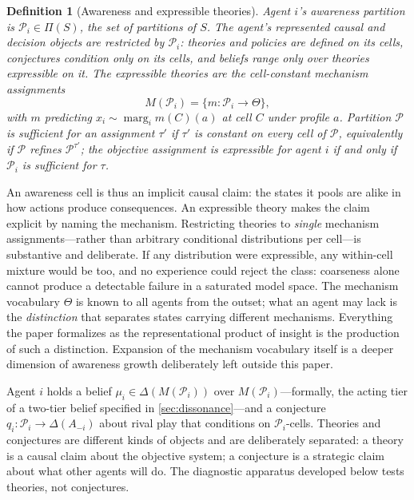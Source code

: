 \documentclass[11pt]{article}
\newtheorem{definition}[assumption]{Definition}
\theoremstyle{definition}
\newcommand{\marg}[1]{\operatorname{marg}_{#1}}
\begin{document}
\begin{definition}[Awareness and expressible theories]
\label{def:awareness}
Agent $i$'s awareness partition is $\mathcal P_i\in\Pi(S)$, the set of partitions of $S$.
The agent's represented causal and decision objects are restricted by \(\mathcal P_i\): theories and policies are defined on its cells, conjectures condition only on its cells, and beliefs range only over theories expressible on it.
The \emph{expressible theories} are the cell-constant mechanism assignments
\begin{equation}
M(\mathcal P_i)=\{m:\mathcal P_i\to\Theta\},
\label{eq:expressible}
\end{equation}
with $m$ predicting $x_i\sim\marg{i}m(C)(a)$ at cell $C$ under profile $a$.
Partition $\mathcal P$ is \emph{sufficient} for an assignment $\tau'$ if $\tau'$ is constant on every cell of $\mathcal P$, equivalently if $\mathcal P$ refines $\mathcal P^{\tau'}$; the objective assignment is expressible for agent $i$ if and only if $\mathcal P_i$ is sufficient for $\tau$.
\end{definition}

An awareness cell is thus an implicit causal claim: the states it pools are alike in how actions produce consequences.
An expressible theory makes the claim explicit by naming the mechanism.
Restricting theories to \emph{single} mechanism assignments---rather than arbitrary conditional distributions per cell---is substantive and deliberate.
If any distribution were expressible, any within-cell mixture would be too, and no experience could reject the class: coarseness alone cannot produce a detectable failure in a saturated model space.
The mechanism vocabulary $\Theta$ is known to all agents from the outset; what an agent may lack is the \emph{distinction} that separates states carrying different mechanisms.
Everything the paper formalizes as the representational product of insight is the production of such a distinction.
Expansion of the mechanism vocabulary itself is a deeper dimension of awareness growth deliberately left outside this paper.

Agent $i$ holds a belief $\mu_i\in\Delta(M(\mathcal P_i))$ over $M(\mathcal P_i)$---formally, the acting tier of a two-tier belief specified in \cref{sec:dissonance}---and a conjecture $q_i:\mathcal P_i\to\Delta(A_{-i})$ about rival play that conditions on $\mathcal P_i$-cells.
Theories and conjectures are different kinds of objects and are deliberately separated: a theory is a causal claim about the objective system; a conjecture is a strategic claim about what other agents will do.
The diagnostic apparatus developed below tests theories, not conjectures.
\end{document}
